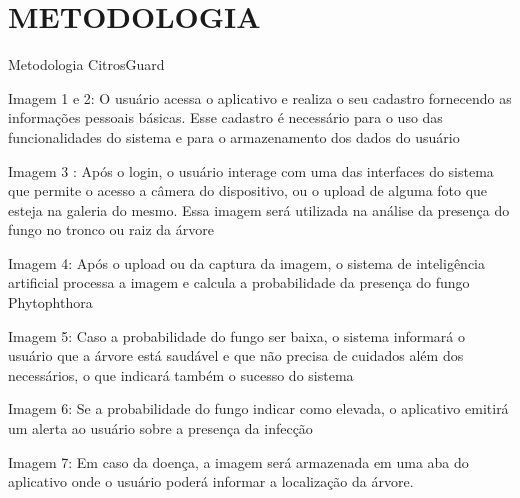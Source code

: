 \documentclass[
  a4paper,%
  12pt,%
  english,%
  brazilian,%
]{article}
\begin{document}
\section*{METODOLOGIA}\begin{photograph}[!h]
  \centering
  \caption{Metodologia CitrosGuard}%
  \label{phot:metodologia}
  \end{photograph}
Imagem 1 e 2: O usuário acessa o aplicativo e realiza o seu cadastro fornecendo as informações pessoais básicas. Esse cadastro é necessário para o uso das funcionalidades do sistema e para o armazenamento dos dados do usuário

Imagem 3 : Após o login, o usuário interage com uma das interfaces do sistema que permite o acesso a câmera do dispositivo, ou o upload de alguma foto que esteja na galeria do mesmo. Essa imagem será utilizada na análise da presença do fungo no tronco ou raiz da árvore

Imagem 4: Após o upload ou da captura da imagem, o sistema de inteligência artificial processa a imagem e calcula a probabilidade da presença do fungo Phytophthora 

Imagem 5: Caso a probabilidade do fungo ser baixa, o sistema informará o usuário que a árvore está saudável e que não precisa de cuidados além dos necessários, o que indicará também o sucesso do sistema

Imagem 6: Se a probabilidade do fungo indicar como elevada, o aplicativo emitirá um alerta ao usuário sobre a presença da infecção

Imagem 7: Em caso da doença, a imagem será armazenada em uma aba do aplicativo onde o usuário poderá informar a localização da árvore.
\end{document}
